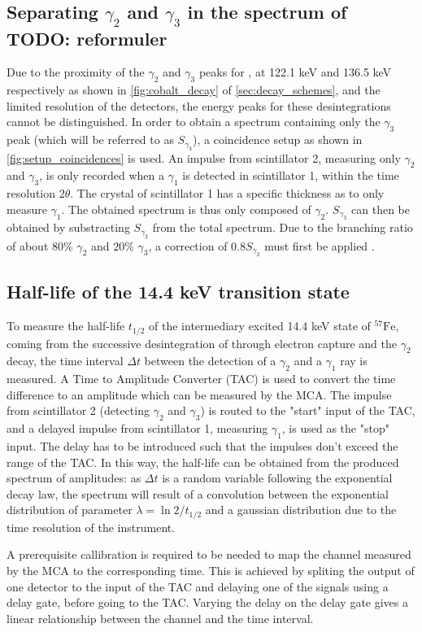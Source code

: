 \subsection{Separating \(\gamma_2\) and \(\gamma_3\) in the spectrum of \cobalt TODO: reformuler}
\label{sec:separation}

Due to the proximity of the \(\gamma_2\) and \(\gamma_3\) peaks for \cobalt, at 122.1 keV and 136.5 keV respectively as shown in \autoref{fig:cobalt_decay} of \autoref{sec:decay_schemes}, and the limited resolution of the detectors, the energy peaks for these desintegrations cannot be distinguished. In order to obtain a spectrum containing only the \(\gamma_3\) peak (which will be referred to as \(S_{\gamma_3}\)), a coincidence setup as shown in \autoref{fig:setup_coincidences} is used. An impulse from scintillator 2, measuring only \(\gamma_2\) and \(\gamma_3\), is only recorded when a \(\gamma_1\) is detected in scintillator 1, within the time resolution \(2\theta\). The crystal of scintillator 1 has a specific thickness as to only measure \(\gamma_1\). The obtained spectrum is thus only composed of \(\gamma_2\). \(S_{\gamma_3}\) can then be obtained by substracting \(S_{\gamma_2}\) from the total spectrum. Due to the branching ratio of about \(80\%\) \(\gamma_2\) and \(20\%\) \(\gamma_3\), a correction of \(0.8 S_{\gamma_2}\) must first be applied \cite{notice_VI}.


\subsection{Half-life of the 14.4 keV transition state}
\label{sec:half_life}

To measure the half-life $t_{1/2}$ of the intermediary excited 14.4 keV state of \(^{57}\textrm{Fe}\), coming from the successive desintegration of \cobalt through electron capture and the \(\gamma_2\) decay, the time interval $\Delta t$ between the detection of a \(\gamma_2\) and a \(\gamma_1\) ray is measured. A Time to Amplitude Converter (TAC) is used to convert the time difference to an amplitude which can be measured by the MCA. The impulse from scintillator 2 (detecting \(\gamma_2\) and \(\gamma_3\)) is routed to the "start" input of the TAC, and a delayed impulse from scintillator 1, measuring \(\gamma_1\), is used as the "stop" input. The delay has to be introduced such that the impulses don't exceed the range of the TAC.
In this way, the half-life can be obtained from the 
produced spectrum of amplitudes: as $\Delta t$ is a 
random variable following the exponential decay law, 
the spectrum will result of a convolution
between the exponential distribution of parameter
$\lambda = \ln{2} / t_{1/2}$ and a gaussian distribution 
due to the time resolution  of the instrument.

A prerequisite callibration is required to be needed to map the channel measured by the MCA to the corresponding time. This is achieved by spliting the output of one detector to the input of the TAC and delaying one of the signals using a delay gate, before going to the TAC. Varying the delay on the delay gate gives a linear relationship between the channel and the time interval.

